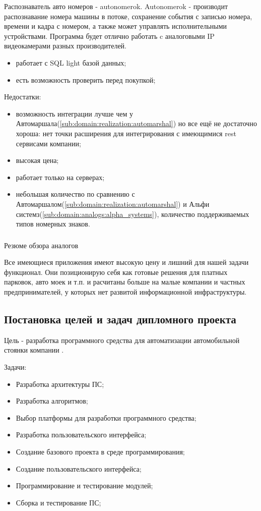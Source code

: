 Распознаватель авто номеров - autonomerok. Autonomerok - производит распознавание номера машины в потоке, сохранение события с записью номера, времени и кадра с номером, а также может управлять исполнительными устройствами. Программа будет отлично работать c аналоговыми IP видеокамерами разных производителей.
\begin{itemize}
  \item работает с SQL light базой данных;
  \item есть возможность проверить перед покупкой;
\end{itemize}
Недостатки:
\begin{itemize}
  \item возможность интеграции лучше чем у Автомаршала(\ref{sub:domain:realization:automarshal}) но все ещё не достаточно хороша: нет точки расширения для интегрирования с имеющимися rest сервисами компании;
  \item высокая цена;
  \item работает только на \windows{} серверах;
  \item небольшая количество по сравнению с Автомаршалом(\ref{sub:domain:realization:automarshal}) и Альфи системз(\ref{sub:domain:analogs:alpha_systems}), количество поддерживаемых типов номерных знаков.
\end{itemize}

\subsubsection{}
Резюме обзора аналогов

Все имеющиеся приложения имеют высокую цену и лишний для нашей задачи функционал. Они позиционирую себя как готовые решения для платных парковок, авто моек и т.п. и расчитаны больше на малые компании и частных предпринимателей, у которых нет развитой информационной инфраструктуры. 

\subsection{Постановка целей и задач дипломного проекта}
Цель - разработка программного средства для автоматизации автомобильной стоянки компании \company{}.


Задачи:
\begin{itemize}
  \item Разработка архитектуры ПС;
  \item Разработка алгоритмов;
  \item Выбор платформы для разработки программного средства;
  \item Разработка пользовательского интерфейса;
  \item Создание базового проекта в среде программирования;
  \item Создание пользовательского интерфейса;
  \item Программирование и тестирование модулей;
  \item Сборка и тестирование ПС;
\end{itemize}

